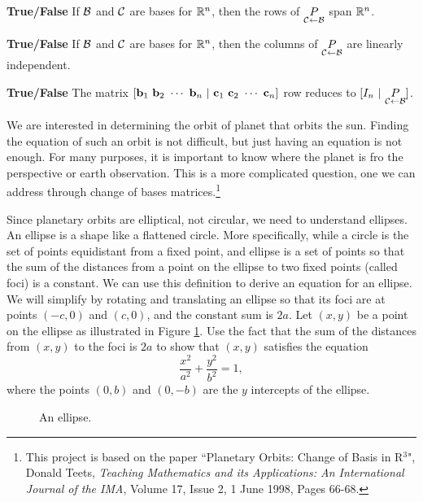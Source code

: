 \item \textbf{True/False} If $\mathcal{B}$ and $\mathcal{C}$ are bases for $\mathbb{R}^n$, then the rows of $\underset{\mathcal{C} \leftarrow \mathcal{B}}{P}$ span $\mathbb{R}^n$. 

\item \textbf{True/False} If $\mathcal{B}$ and $\mathcal{C}$ are bases for $\mathbb{R}^n$, then the columns of $\underset{\mathcal{C} \leftarrow \mathcal{B}}{P}$ are linearly independent.  

\item \textbf{True/False} The matrix $[\mathbf{b}_1 \ \mathbf{b}_2 \ \cdots \ \mathbf{b}_n \ | \ \mathbf{c}_1 \ \mathbf{c}_2 \ \cdots \ \mathbf{c}_n]$ row reduces to $[I_n \ | \ \underset{\mathcal{C} \leftarrow \mathcal{B}}{P}]$. 

\ea


\ee

\label{sec:proj_orbits_cob}

We are interested in determining the orbit of planet that orbits the sun. Finding the equation of such an orbit is not difficult, but just having an equation is not enough. For many purposes, it is important to know where the planet is fro the perspective or earth observation. This is a more complicated question, one we can address through change of bases matrices.\footnote{This project is based on the paper ``Planetary Orbits: Change of Basis in R$^3$", Donald Teets,  \emph{Teaching Mathematics and its Applications: An International Journal of the IMA}, Volume 17, Issue 2, 1 June 1998, Pages 66-68.}

\begin{pactivity} \label{act:orbits_ellipse} Since planetary orbits are elliptical, not circular, we need to understand ellipses.  An ellipse is a shape like a flattened circle. More specifically, while a circle is the set of points equidistant from a fixed point, and ellipse is a set of points so that the sum of the distances from a point on the ellipse to two fixed points (called foci) is a constant. We can use this definition to derive an equation for an ellipse. We will simplify by rotating and translating an ellipse so that its foci are at points $(-c,0)$ and $(c,0)$, and the constant sum is $2a$. Let $(x,y)$ be a point on the ellipse as illustrated in Figure \ref{F:ellipse}. Use the fact that the sum of the distances from $(x,y)$ to the foci is $2a$ to show that $(x,y)$ satisfies the equation  
\begin{equation} \label{eq:orbit_ellipse} 
\frac{x^2}{a^2} + \frac{y^2}{b^2} = 1,
\end{equation} 
where the points $(0,b)$ and $(0,-b)$ are the $y$ intercepts of the ellipse. 
\begin{figure}[h]
\begin{center}
\end{center}
\caption{An ellipse.}
\label{F:ellipse}
\end{figure}


\end{pactivity}


